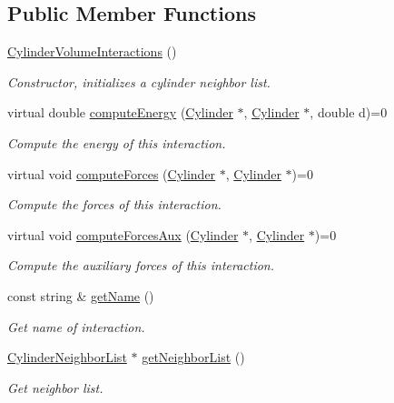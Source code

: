 \subsection*{Public Member Functions}
\begin{DoxyCompactItemize}
\item 
\hyperlink{classCylinderVolumeInteractions_a669c6cb7195f393029b0a8c9b117e10a}{Cylinder\+Volume\+Interactions} ()
\begin{DoxyCompactList}\small\item\em Constructor, initializes a cylinder neighbor list. \end{DoxyCompactList}\item 
virtual double \hyperlink{classCylinderVolumeInteractions_a6874e7feffad1b76c0915f274c55968d}{compute\+Energy} (\hyperlink{classCylinder}{Cylinder} $\ast$, \hyperlink{classCylinder}{Cylinder} $\ast$, double d)=0
\begin{DoxyCompactList}\small\item\em Compute the energy of this interaction. \end{DoxyCompactList}\item 
virtual void \hyperlink{classCylinderVolumeInteractions_a34b2eebbe07da2bf93716b57bb2f93fa}{compute\+Forces} (\hyperlink{classCylinder}{Cylinder} $\ast$, \hyperlink{classCylinder}{Cylinder} $\ast$)=0
\begin{DoxyCompactList}\small\item\em Compute the forces of this interaction. \end{DoxyCompactList}\item 
virtual void \hyperlink{classCylinderVolumeInteractions_ad29d0e3399ff15116e58a60826bbdf85}{compute\+Forces\+Aux} (\hyperlink{classCylinder}{Cylinder} $\ast$, \hyperlink{classCylinder}{Cylinder} $\ast$)=0
\begin{DoxyCompactList}\small\item\em Compute the auxiliary forces of this interaction. \end{DoxyCompactList}\item 
const string \& \hyperlink{classCylinderVolumeInteractions_ad9a9e25c4567d273dc5347d4d0c1e834}{get\+Name} ()
\begin{DoxyCompactList}\small\item\em Get name of interaction. \end{DoxyCompactList}\item 
\hyperlink{classCylinderNeighborList}{Cylinder\+Neighbor\+List} $\ast$ \hyperlink{classCylinderNLContainer_afce343b3251cf0ed087cf5a62fb6aaee}{get\+Neighbor\+List} ()
\begin{DoxyCompactList}\small\item\em Get neighbor list. \end{DoxyCompactList}\end{DoxyCompactItemize}
